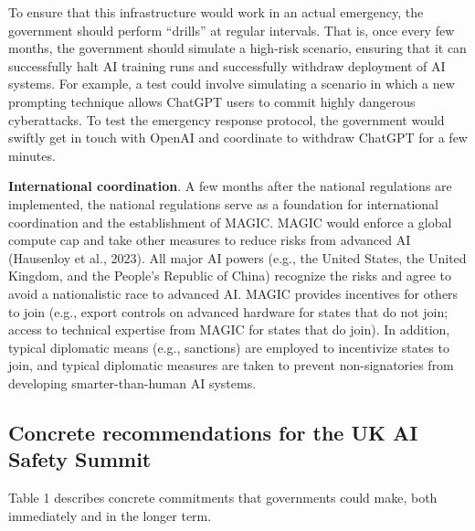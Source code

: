 \documentclass[12pt,a4paper]{article}
\begin{document}
To ensure that this infrastructure would work in an actual emergency, the government should perform “drills” at regular intervals. That is, once every few months, the government should simulate a high-risk scenario, ensuring that it can successfully halt AI training runs and successfully withdraw deployment of AI systems. For example, a test could involve simulating a scenario in which a new prompting technique allows ChatGPT users to commit highly dangerous cyberattacks. To test the emergency response protocol, the government would swiftly get in touch with OpenAI and coordinate to withdraw ChatGPT for a few minutes. 

\textbf{International coordination}. A few months after the national regulations are implemented, the national regulations serve as a foundation for international coordination and the establishment of MAGIC. MAGIC would enforce a global compute cap and take other measures to reduce risks from advanced AI (Hausenloy et al., 2023). All major AI powers (e.g., the United States, the United Kingdom, and the People’s Republic of China) recognize the risks and agree to avoid a nationalistic race to advanced AI. MAGIC provides incentives for others to join (e.g., export controls on advanced hardware for states that do not join; access to technical expertise from MAGIC for states that do join). In addition, typical diplomatic means (e.g., sanctions) are employed to incentivize states to join, and typical diplomatic measures are taken to prevent non-signatories from developing smarter-than-human AI systems.

\subsection{Concrete recommendations for the UK AI Safety Summit}

Table 1 describes concrete commitments that governments could make, both immediately and in the longer term.
\end{document}

